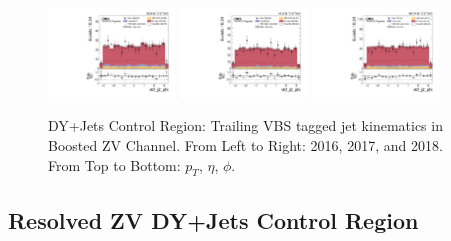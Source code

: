 \begin{figure}[!ht]
  \includegraphics[width=0.30\textwidth]{analysis_plots/2016_zv/cr_vjets_l/vbf_j2_phi.pdf}
  \includegraphics[width=0.30\textwidth]{analysis_plots/2017_zv/cr_vjets_l/vbf_j2_phi.pdf}
  \includegraphics[width=0.30\textwidth]{analysis_plots/2018_zv/cr_vjets_l/vbf_j2_phi.pdf} \\
  \caption[DY+Jets Control Region: Trailing VBS tagged jet kinematics in Boosted ZV Channel]%
  {DY+Jets Control Region: Trailing VBS tagged jet kinematics in Boosted ZV Channel. From Left to Right: 2016,
    2017, and 2018. From Top to Bottom: \( p_T \), \( \eta \), \( \phi \).}%
  \label{fig:zv-cr-vjets-l-vbs2-pt-eta-m}
\end{figure}

\clearpage
\subsection{
  Resolved ZV DY+Jets Control Region
}\label{ch_vbs:resolved-plots}

